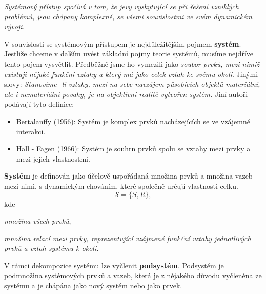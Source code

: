        \emph{Systémový přístup spočívá v tom, že jevy vyskytující se při řešení vzniklých problémů, 
       jsou chápany komplexně, se všemi souvislostmi ve svém dynamickém vývoji.}
       
       V souvislosti se systémovým přístupem je nejdůležitějším pojmem \textbf{systém}. Jestliže 
       chceme v dalším uvést základní pojmy teorie systémů, musíme nejdříve tento pojem vysvětlit. 
       Předběžně jsme ho vymezili jako \emph{soubor prvků, mezi nimiž existuji nějaké funkční 
       vztahy a který má jako celek vztah ke svému okolí}. Jinými slovy: \emph{Stanovíme- li 
       vztahy, mezi na sebe navzájem působících objektů materiální, ale i nemateriální povahy, je na
       objektivní realitě vytvořen systém.} Jiní autoři podávají tyto definice:
       \begin{itemize}\addtolength{\itemsep}{-0.5\baselineskip}
         \item Bertalanffy (1956): Systém je komplex prvků nacházejících se ve vzájemné interakci.
         \item Hall - Fagen (1966): Systém je souhrn prvků spolu se vztahy mezi prvky a mezi jejich 
               vlastnostmi.
       \end{itemize}

       \begin{definition}
        \textbf{Systém} je definován jako účelově uspořádaná množina prvků a množina vazeb mezi 
        nimi, s dynamickým chováním, které společně určují vlastnosti celku.
        \begin{equation}
          \mathscr{S} = \{S,R \},
        \end{equation}
        kde
        \begin{description}[leftmargin=5em,style=nextline]
          \item[\hspace{2em}\(S \ldots\)] \emph{množina všech prvků},
          \item[\hspace{2em}\(R \ldots\)] \emph{množina relací mezi prvky, reprezentující vzájmené 
                                         funkční vztahy jednotlivých prvků a vztah systému k okolí.}
        \end{description}
       \end{definition}
       
       V rámci dekompozice systému lze vyčlenit \textbf{podsystém}. Podsystém je podmnožina
       systémových prvků a vazeb, která je z nějakého důvodu vyčleněna ze systému a je chápána
       jako nový systém nebo jako prvek.
       
